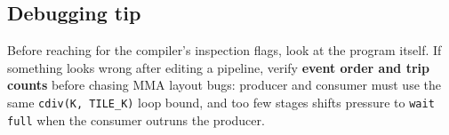 \subsection*{Debugging tip}

Before reaching for the compiler's inspection flags, look at the program itself. If something looks wrong after editing a pipeline, verify \textbf{event order and trip counts} before chasing MMA layout bugs: producer and consumer must use the same \texttt{cdiv(K, TILE\_\allowbreak{}K)} loop bound, and too few stages shifts pressure to \texttt{wait full} when the consumer outruns the producer.
